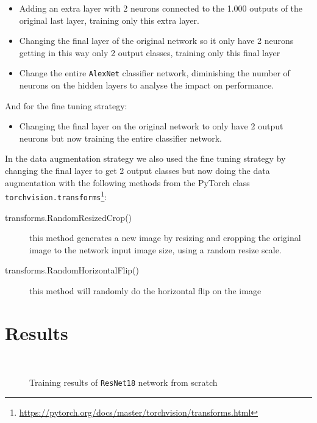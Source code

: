 \documentclass[twocolumn]{article}
\newcommand{\tamfig}{0.9}
\begin{document}
\begin{itemize}[noitemsep]
\item Adding an extra layer with 2 neurons connected to the 1.000 outputs of the original last layer, training only this extra layer.

\item Changing the final layer of the original network so it only have 2 neurons getting in this way only 2 output classes, training only this final layer

\item Change the entire \texttt{AlexNet} classifier network, diminishing the number of neurons on the hidden layers to analyse the impact on performance.
\end{itemize}
And for the fine tuning strategy:
\begin{itemize}[noitemsep]
\item Changing the final layer on the original network to only have 2 output neurons but now training the entire classifier network.
\end{itemize}

In the data augmentation strategy we also used the fine tuning strategy by changing the final layer to get 2 output classes but now doing the data augmentation with the following methods from the PyTorch class \texttt{torchvision.transforms}\footnote{\url{https://pytorch.org/docs/master/torchvision/transforms.html}}:
\begin{description}
\item[transforms.RandomResizedCrop()] this method generates a new image by resizing and cropping the original image to the network input image size, using a random resize scale.
\item[transforms.RandomHorizontalFlip()] this method will randomly do the horizontal flip on the image
\end{description}

\section{Results}
\begin{figure}[h]
{}
\\
\caption{Training results of \texttt{ResNet18} network from scratch}
\label{grafico_zero}
\end{figure}
\end{document}
